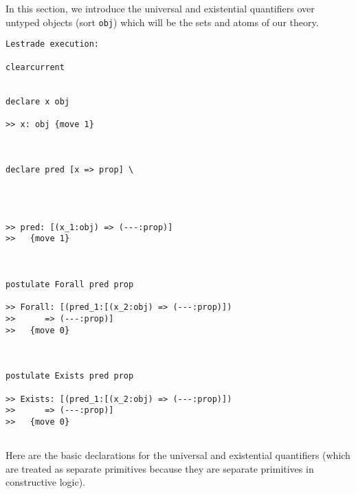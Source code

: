 \documentclass[12pt]{article}
\begin{document}
In this section, we introduce the universal and existential quantifiers over untyped objects (sort {\tt obj}) which will be the sets and atoms of our theory.

\begin{verbatim}Lestrade execution:

clearcurrent


declare x obj

>> x: obj {move 1}



declare pred [x => prop] \
   



>> pred: [(x_1:obj) => (---:prop)]
>>   {move 1}



postulate Forall pred prop

>> Forall: [(pred_1:[(x_2:obj) => (---:prop)])
>>      => (---:prop)]
>>   {move 0}



postulate Exists pred prop

>> Exists: [(pred_1:[(x_2:obj) => (---:prop)])
>>      => (---:prop)]
>>   {move 0}


\end{verbatim}

Here are the basic declarations for the universal and existential quantifiers (which are treated as separate primitives because they are separate
primitives in constructive logic).  
\end{document}
